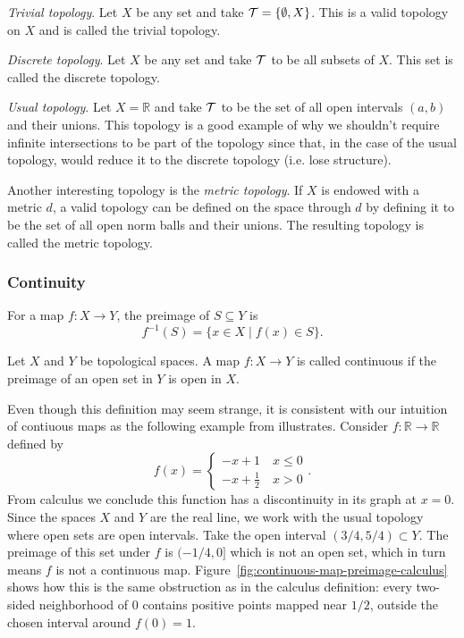 \textit{Trivial topology}. Let $X$ be any set and take $\mathcal{T} = \{\emptyset, X\}$.
This is a valid topology on $X$ and is called the trivial topology. 

\textit{Discrete topology}. Let $X$ be any set and take $\mathcal{T}$ to be all subsets of $X$.
This set is called the discrete topology.

\textit{Usual topology}. Let $X = \mathbb{R}$ and take $\mathcal{T}$ to be the set of all open intervals $(a, b)$ and their unions.
This topology is a good example of why we shouldn't require infinite intersections to be part of the topology since that, in the case of the usual topology, would reduce it to the discrete topology (i.e. lose structure).

Another interesting topology is the \textit{metric topology}.
If $X$ is endowed with a metric $d$, a valid topology can be defined on the space through $d$ by defining it to be the set of all open norm balls and their unions.
The resulting topology is called the metric topology.

\subsubsection{Continuity}

For a map $f : X \to Y$, the preimage of $S \subseteq Y$ is
\[
  f^{-1}(S) = \{x \in X \mid f(x) \in S\}.
\]
\begin{Def}
    Let $X$ and $Y$ be topological spaces.
    A map $f : X \to Y$ is called continuous if the preimage of an open set in $Y$ is open in $X$. 
\end{Def}

Even though this definition may seem strange, it is consistent with our intuition of contiuous maps as the following example from \cite{Nakahara:2003nw} illustrates.
Consider $f : \mathbb{R} \to \mathbb{R}$ defined by
\[
    f(x) = \begin{cases}
        -x + 1 \quad x \leq 0\\
        -x + \frac{1}{2} \quad x > 0
    \end{cases}.
\]
From calculus we conclude this function has a discontinuity in its graph at $x = 0$.
Since the spaces $X$ and $Y$ are the real line, we work with the usual topology where open sets are open intervals. 
Take the open interval $(3/4, 5/4) \subset Y$. 
The preimage of this set under $f$ is $(-1/4, 0]$ which is not an open set, which in turn means $f$ is not a continuous map.
Figure~\ref{fig:continuous-map-preimage-calculus} shows how this is the same obstruction as in the calculus definition: every two-sided neighborhood of $0$ contains positive points mapped near $1/2$, outside the chosen interval around $f(0)=1$.

